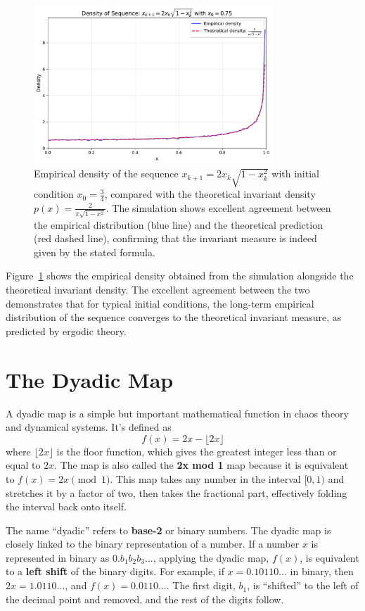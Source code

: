 \documentclass[12pt,a4paper]{article}
\begin{document}
\begin{figure}[htbp]
\centering
\includegraphics[width=0.8\textwidth]{data/density_0.75.pdf}
\caption{Empirical density of the sequence $x_{k+1} = 2x_k\sqrt{1-x_k^2}$ with initial condition $x_0 = \frac{3}{4}$, compared with the theoretical invariant density $p(x) = \frac{2}{\pi\sqrt{1-x^2}}$. The simulation shows excellent agreement between the empirical distribution (blue line) and the theoretical prediction (red dashed line), confirming that the invariant measure is indeed given by the stated formula.}
\label{fig:density}
\end{figure}

Figure~\ref{fig:density} shows the empirical density obtained from the simulation alongside the theoretical invariant density. The excellent agreement between the two demonstrates that for typical initial conditions, the long-term empirical distribution of the sequence converges to the theoretical invariant measure, as predicted by ergodic theory.

\section{The Dyadic Map}

A dyadic map is a simple but important mathematical function in chaos theory and dynamical systems. It's defined as 
\[
f(x) = 2x - \lfloor 2x \rfloor
\]
where $\lfloor 2x \rfloor$ is the floor function, which gives the greatest integer less than or equal to $2x$. The map is also called the \textbf{2x mod 1} map because it is equivalent to $f(x) = 2x \pmod{1}$. This map takes any number in the interval $[0, 1)$ and stretches it by a factor of two, then takes the fractional part, effectively folding the interval back onto itself.

The name ``dyadic'' refers to \textbf{base-2} or binary numbers. The dyadic map is closely linked to the binary representation of a number. If a number $x$ is represented in binary as $0.b_1b_2b_3...$, applying the dyadic map, $f(x)$, is equivalent to a \textbf{left shift} of the binary digits. For example, if $x = 0.10110...$ in binary, then $2x = 1.0110...$, and $f(x) = 0.0110...$. The first digit, $b_1$, is ``shifted'' to the left of the decimal point and removed, and the rest of the digits follow.
\end{document}

